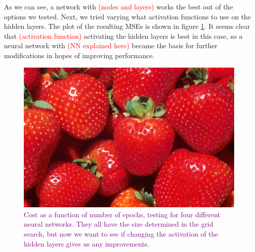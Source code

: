 As we can see, a network with \textcolor{red}{(nodes and layers)} works the best out of the options we tested. Next, we tried varying what activation functions to use on the hidden layers. The plot of the resulting MSEs is shown in figure \ref{fig:activationfunctions_cost_numpred}. It seems clear that \textcolor{red}{(activation function)} activating the hidden layers is best in this case, so a neural network with \textcolor{red}{(NN explained here)} became the basis for further modifications in hopes of improving performance. 
\begin{figure}
    \centering
    \includegraphics[width=0.5\linewidth]{figures/placeholders/activationfunctions_cost_numpred.png}
    \caption{\textcolor{purple}{Cost as a function of number of epochs, testing for four different neural networks. They all have the size determined in the grid search, but now we want to see if changing the activation of the hidden layers gives us any improvements.}}
    \label{fig:activationfunctions_cost_numpred}
\end{figure}

